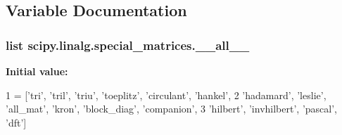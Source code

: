 \subsection{Variable Documentation}
\hypertarget{namespacescipy_1_1linalg_1_1special__matrices_a5d4edce99d2a3ae0302b0ae9371ff6fe}{}
\subsubsection[{\+\_\+\+\_\+all\+\_\+\+\_\+}]{\setlength{\rightskip}{0pt plus 5cm}list scipy.\+linalg.\+special\+\_\+matrices.\+\_\+\+\_\+all\+\_\+\+\_\+}\label{namespacescipy_1_1linalg_1_1special__matrices_a5d4edce99d2a3ae0302b0ae9371ff6fe}
{\bfseries Initial value\+:}
\begin{DoxyCode}
1 = [\textcolor{stringliteral}{'tri'}, \textcolor{stringliteral}{'tril'}, \textcolor{stringliteral}{'triu'}, \textcolor{stringliteral}{'toeplitz'}, \textcolor{stringliteral}{'circulant'}, \textcolor{stringliteral}{'hankel'},
2            \textcolor{stringliteral}{'hadamard'}, \textcolor{stringliteral}{'leslie'}, \textcolor{stringliteral}{'all\_mat'}, \textcolor{stringliteral}{'kron'}, \textcolor{stringliteral}{'block\_diag'}, \textcolor{stringliteral}{'companion'},
3            \textcolor{stringliteral}{'hilbert'}, \textcolor{stringliteral}{'invhilbert'}, \textcolor{stringliteral}{'pascal'}, \textcolor{stringliteral}{'dft'}]
\end{DoxyCode}
